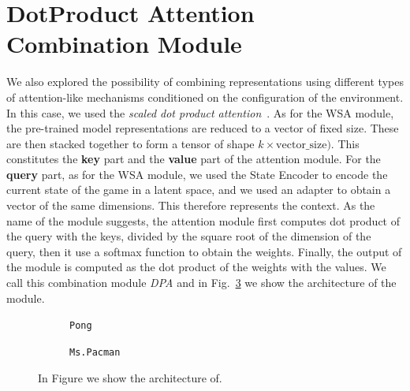 \section{DotProduct Attention Combination Module}
\label{sec:dpa}

We also explored the possibility of combining representations using different types of attention-like mechanisms conditioned on the configuration of the environment.
In this case, we used the \textit{scaled dot product attention}~\citep{vaswani2017attention}.
As for the WSA module, the pre-trained model representations are reduced to a vector of fixed size.
These are then stacked together to form a tensor of shape $k \times \text{vector\_size})$.
This constitutes the \textbf{key} part and the \textbf{value} part of the attention module.
For the \textbf{query} part, as for the WSA module, we used the State Encoder to encode the current state of the game in a latent space, and we used an adapter to obtain a vector of the same dimensions.
This therefore represents the context.
As the name of the module suggests, the attention module first computes dot product of the query with the keys, divided by the square root of the dimension of the query, then it use a softmax function to obtain the weights.
Finally, the output of the module is computed as the dot product of the weights with the values.
We call this combination module \textit{DPA} and in Fig.~\ref{fig:dpa_combination} we show the architecture of the module.





\begin{figure}[ht]
    \centering
    \begin{subfigure}[b]{0.47\textwidth}
        \centering
        \fbox{\rule[-.5cm]{0cm}{4cm} \rule[-.5cm]{4cm}{0cm}}
        \caption{\texttt{Pong}}
        \label{fig:reservoir_combination}
    \end{subfigure}
    \hfill
    \begin{subfigure}[b]{0.47\textwidth}
        \centering
        \fbox{\rule[-.5cm]{0cm}{4cm} \rule[-.5cm]{4cm}{0cm}}
        \caption{\texttt{Ms.Pacman}}
        \label{fig:dpa}
    \end{subfigure}

    \caption{In Figure we show the architecture of.}
    \label{fig:dpa_combination}
\end{figure}

